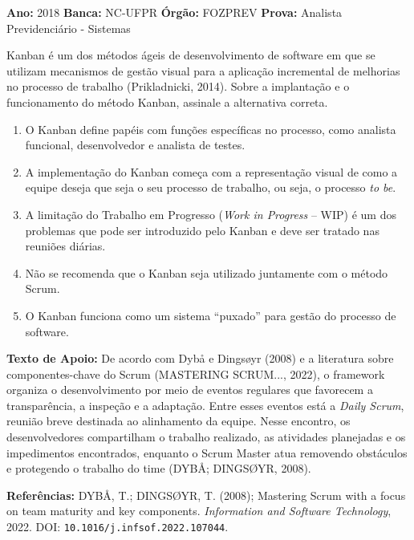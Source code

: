 \documentclass[12pt]{article}
\begin{document}
\begin{metaConcurso}
\small \textbf{Ano:} 2018 \qquad \textbf{Banca:} NC-UFPR \qquad \textbf{Órgão:} FOZPREV \qquad \textbf{Prova:} Analista Previdenciário - Sistemas
\end{metaConcurso}

\vspace{0.15cm}
\noindent Kanban é um dos métodos ágeis de desenvolvimento de software em que se utilizam mecanismos de gestão visual para a aplicação incremental de melhorias no processo de trabalho (Prikladnicki, 2014). Sobre a implantação e o funcionamento do método Kanban, assinale a alternativa correta.

\begin{enumerate}[label=\Alph*)]
    \item O Kanban define papéis com funções específicas no processo, como analista funcional, desenvolvedor e analista de testes.
    \item A implementação do Kanban começa com a representação visual de como a equipe deseja que seja o seu processo de trabalho, ou seja, o processo \textit{to be}.
    \item A limitação do Trabalho em Progresso (\textit{Work in Progress} -- WIP) é um dos problemas que pode ser introduzido pelo Kanban e deve ser tratado nas reuniões diárias.
    \item Não se recomenda que o Kanban seja utilizado juntamente com o método Scrum.
    \item O Kanban funciona como um sistema ``puxado'' para gestão do processo de software.
\end{enumerate}

\vspace{0.6cm}

\vspace{0.15cm}

\begin{textoApoio}
\small
\textbf{Texto de Apoio:} De acordo com Dybå e Dingsøyr (2008) e a literatura sobre componentes-chave do Scrum (MASTERING SCRUM..., 2022), o framework organiza o desenvolvimento por meio de eventos regulares que favorecem a transparência, a inspeção e a adaptação. Entre esses eventos está a \textit{Daily Scrum}, reunião breve destinada ao alinhamento da equipe. Nesse encontro, os desenvolvedores compartilham o trabalho realizado, as atividades planejadas e os impedimentos encontrados, enquanto o Scrum Master atua removendo obstáculos e protegendo o trabalho do time (DYBÅ; DINGSØYR, 2008).

\vspace{0.15cm}
\noindent\textbf{Referências:} DYBÅ, T.; DINGSØYR, T. (2008); Mastering Scrum with a focus on team maturity and key components. \textit{Information and Software Technology}, 2022. DOI: \texttt{10.1016/j.infsof.2022.107044}.
\end{textoApoio}
\end{document}
